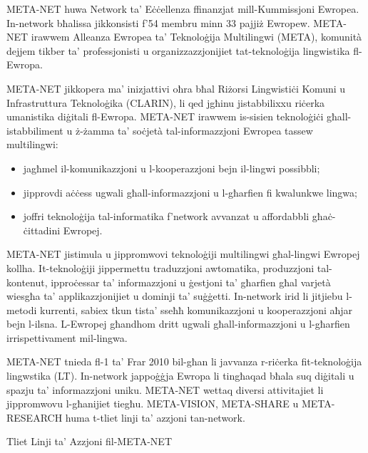\documentclass[]{../../metanetpaper}
\begin{document}
\cleardoublepage



\begin{multicols}{2}

META-NET huwa Network ta’ Eċċellenza ffinanzjat mill-Kummissjoni Ewropea. In-network bħalissa jikkonsisti f’54 membru minn 33 pajjiż Ewropew. META-NET irawwem Alleanza Ewropea ta’ Teknoloġija Multilingwi (META), komunità dejjem tikber ta’ professjonisti u organizzazzjonijiet tat-teknoloġija lingwistika fl-Ewropa. 

META-NET jikkopera ma’ inizjattivi oħra bħal Riżorsi Lingwistiċi Komuni u Infrastruttura Teknoloġika (CLARIN), li qed jgħinu jistabbilixxu riċerka umanistika diġitali fl-Ewropa. META-NET irawwem is-sisien teknoloġiċi għall-istabbiliment u ż-żamma ta’ soċjetà tal-informazzjoni Ewropea tassew multilingwi:

\begin{itemize}
\item jagħmel il-komunikazzjoni u l-kooperazzjoni bejn il-lingwi possibbli;
\item jipprovdi aċċess ugwali għall-informazzjoni u l-għarfien fi kwalunkwe lingwa;
\item joffri teknoloġija tal-informatika f’network avvanzat u affordabbli  għaċ-ċittadini Ewropej.  
\end{itemize}

META-NET jistimula u jippromwovi teknoloġiji multilingwi għal-lingwi Ewropej kollha. It-teknoloġiji jippermettu traduzzjoni awtomatika, produzzjoni tal-kontenut, ipproċessar ta’ informazzjoni u ġestjoni ta’ għarfien għal varjetà wiesgħa ta’ applikazzjonijiet u dominji ta’ suġġetti. In-network irid li jitjiebu l-metodi kurrenti, sabiex tkun tista’ sseħħ komunikazzjoni u kooperazzjoni aħjar bejn l-ilsna. L-Ewropej għandhom dritt ugwali għall-informazzjoni u l-għarfien irrispettivament mil-lingwa.

META-NET tnieda fl-1 ta’ Frar 2010 bil-għan li javvanza r-riċerka fit-teknoloġija lingwstika (LT). In-network jappoġġja Ewropa li tingħaqad bħala suq diġitali u spazju ta’ informazzjoni uniku. META-NET wettaq diversi attivitajiet li jippromwovu l-għanijiet tiegħu. META-VISION, META-SHARE u META-RESEARCH huma t-tliet linji ta’ azzjoni tan-network.  

Tliet Linji ta’ Azzjoni fil-META-NET


\end{multicols}
\end{document}
